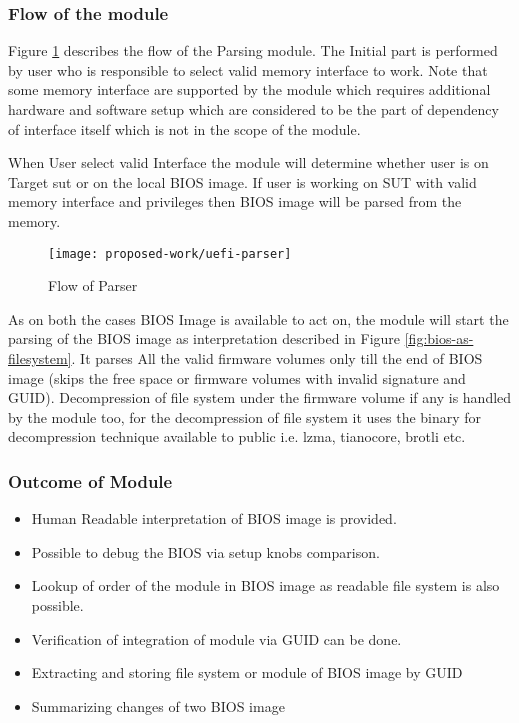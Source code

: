 \subsubsection{Flow of the module}
Figure \ref{fig:uefi-parser} describes the flow of the Parsing module. The Initial part is performed by user who is responsible to select valid memory interface to work. Note that some memory interface are supported by the module which requires additional hardware and software setup which are considered to be the part of dependency of interface itself which is not in the scope of the module.

When User select valid Interface the module will determine whether user is on Target \gls{sut} or on the local BIOS image.
If user is working on SUT with valid memory interface and privileges then BIOS image will be parsed from the memory.

\begin{figure}[!htbp]
	\centering
	\texttt{[image: proposed-work/uefi-parser]}
	\caption{Flow of Parser}\label{fig:uefi-parser}
\end{figure}

As on both the cases BIOS Image is available to act on, the module will start the parsing of the BIOS image as interpretation described in Figure \ref{fig:bios-as-filesystem}. It parses All the valid firmware volumes only till the end of BIOS image (skips the free space or firmware volumes with invalid signature and GUID). Decompression of file system under the firmware volume if any is handled by the module too, for the decompression of file system it uses the binary for decompression technique available to public i.e. lzma, tianocore, brotli etc.


\subsubsection{Outcome of Module}
\begin{itemize}
	\item Human Readable interpretation of BIOS image is provided.
	\item Possible to debug the BIOS via setup knobs comparison.
	\item Lookup of order of the module in BIOS image as readable file system is also possible.
	\item Verification of integration of module via GUID can be done.
	\item Extracting and storing file system or module of BIOS image by GUID
	\item Summarizing changes of two BIOS image
\end{itemize}



